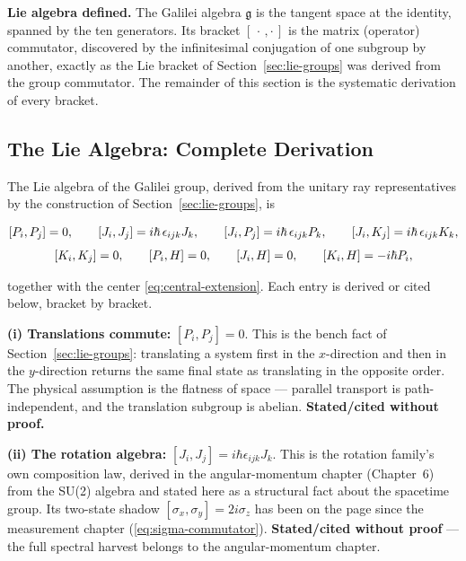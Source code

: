 \medskip\noindent\textbf{Lie algebra defined.} The Galilei algebra $\mathfrak{g}$ is the tangent space at the identity, spanned by the ten generators. Its bracket $[\,\cdot\,,\cdot\,]$ is the matrix (operator) commutator, discovered by the infinitesimal conjugation of one subgroup by another, exactly as the Lie bracket of Section~\ref{sec:lie-groups} was derived from the group commutator. The remainder of this section is the systematic derivation of every bracket.

\subsection{The Lie Algebra: Complete Derivation}
\label{sec:galilei-algebra-derivation}

The Lie algebra of the Galilei group, derived from the unitary ray representatives by the construction of Section~\ref{sec:lie-groups}, is
\begin{linenomath}
\begin{equation}
\begin{gathered}
\relax [P_i,P_j] = 0,\qquad
[J_i,J_j] = i\hbar\,\epsilon_{ijk}J_k,\qquad
[J_i,P_j] = i\hbar\,\epsilon_{ijk}P_k,\qquad
[J_i,K_j] = i\hbar\,\epsilon_{ijk}K_k,\\[4pt]
[K_i,K_j] = 0,\qquad
[P_i,H] = 0,\qquad
[J_i,H] = 0,\qquad
[K_i,H] = -i\hbar P_i,
\end{gathered}
\label{eq:galilei-algebra}
\end{equation}
\end{linenomath}
together with the center \eqref{eq:central-extension}. Each entry is derived or cited below, bracket by bracket.

\medskip\noindent\textbf{(i) Translations commute:} $[P_i,P_j]=0$. This is the bench fact of Section~\ref{sec:lie-groups}: translating a system first in the $x$-direction and then in the $y$-direction returns the same final state as translating in the opposite order. The physical assumption is the flatness of space --- parallel transport is path-independent, and the translation subgroup is abelian. \textbf{Stated/cited without proof.}

\medskip\noindent\textbf{(ii) The rotation algebra:} $[J_i,J_j]=i\hbar\epsilon_{ijk}J_k$. This is the rotation family's own composition law, derived in the angular-momentum chapter (Chapter~6) from the SU(2) algebra and stated here as a structural fact about the spacetime group. Its two-state shadow $[\sigma_x,\sigma_y]=2i\sigma_z$ has been on the page since the measurement chapter (\eqref{eq:sigma-commutator}). \textbf{Stated/cited without proof} --- the full spectral harvest belongs to the angular-momentum chapter.

